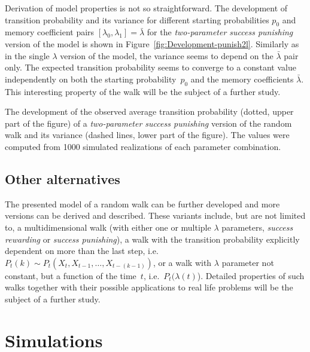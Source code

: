 Derivation of model properties is not so straightforward.
The development
of transition probability and its variance for different starting
probabilities $p_{0}$ and memory coefficient pairs $ [\lambda_{0},\lambda_{1}]=\bar{\lambda}$
for the \emph{two-parameter success punishing} version of the model
is shown in Figure~\ref{fig:Development-punish2l}.
Similarly as in
the single $\lambda$ version of the model, the variance seems to
depend on the $\bar{\lambda}$ pair only.
The expected transition
probability seems to converge to a constant value independently on
both the starting probability~$p_{0}$ and the memory coefficients $\bar{\lambda}$.
This interesting property of the walk will be the subject of a further study.

\midinsert
\centerline{}
\caption{The development of the observed average
transition probability (dotted, upper part of the figure) of a \emph{two-parameter success
punishing} version of the random walk and its variance (dashed lines, lower part of the figure).
The values
were computed from 1000 simulated realizations of each parameter
combination.}\label{fig:Development-punish2l}
\endinsert

\subsection{Other alternatives}\label{subsec:other-alternatives}
The presented model of a random walk can be further developed and
more versions can be derived and described.
These variants include,
but are not limited to, a multidimensional walk (with either one or multiple
$\lambda$ parameters, \emph{success rewarding} or \emph{success
punishing}), a walk with the transition probability explicitly dependent
on more than the last step, i.e.~$P_{t}(k)\sim P_{t}(X_{t}, X_{t-1},\dots,X_{t-(k-1)})$,
or a walk with $\lambda$ parameter not constant, but a function
of the time~$t$, i.e.~$P_{t}(\lambda(t)$).
Detailed properties of
such walks together with their possible applications to real life
problems will be the subject of a further study.


\section{Simulations}\label{sec:Simulations}

